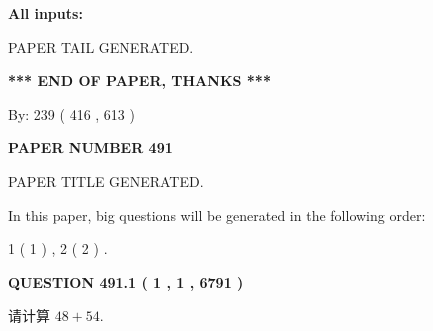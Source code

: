 \documentclass{ctexart}
\begin{document}
   
   
   
\noindent\vspace{0.1in}\hspace{-0.08in} {\textbf{\Large{All inputs: }}}
   
   
   
   
   
   
 \vspace{0.2in}
 
   
   
\vspace{2.0in} PAPER TAIL GENERATED.
   
   
   
   
\vspace{1.0in} 
{\textbf{\large{ *** END OF PAPER, THANKS *** }}} 
   
   
\hspace{1.0in} By: 
 239 ( 416 ,  613 )
   
   
   
   
\newpage 
\setcounter{page}{ 
   491001 } 
   
   
   
   
 {\textbf{ \Large{ PAPER NUMBER  491  }}}
   
   
\vspace{0.2in}
   
   
   
   
   
   
   
   
 \vspace{0.2in}
 
 
 
 
   
   
 PAPER TITLE GENERATED.
   
   
   
\vspace{0.2in}
   
In this paper, big questions will be generated in the following order: 
   
   
   1 ( 1 )
 ,
   2 ( 2 )
 .
  
\vspace{0.2in}
  
{\textbf{\Large{QUESTION
491.1 
 ( 1 , 1 , 6791 )
}}}
  
  
 
请计算 $ %
48 +  %
54 $.
 
 
 
\noindent{}
 
\end{document}
